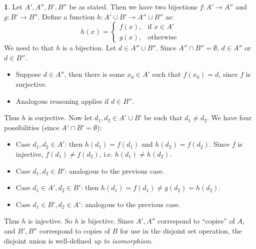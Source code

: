 \documentclass{article}
\theoremstyle{definition}
\theoremstyle{definition}
\theoremstyle{definition}
\newtheorem{solution-internal}{}[subsection]
\newenvironment{solution}{
  \medskip
  \begin{solution-internal}
}{
  \end{solution-internal}
}
\begin{document}
\begin{solution}
Let $A', A'', B', B''$ be as stated. Then we have two bijections $f\colon A' \to A''$ and $g\colon B' \to B''$. Define a function $h\colon A' \cup B' \to A'' \cup B''$ as:
\[ h(x) = 
\left\{
  \begin{array}{ll}
    f(x), & \text{if $x \in A'$} \\
    g(x), & \text{otherwise}
  \end{array}\right.
\]
We need to that $h$ is a bijection. Let $d \in A'' \cup B''$. Since $A'' \cap B'' = \emptyset$, $d \in A''$ or $d \in B''$.
\begin{itemize}
\item Suppose $d \in A''$, then there is some $x_0 \in A'$ such that $f(x_0) = d$, since $f$ is surjective.
\item Analogous reasoning applies if $d \in B''$.
\end{itemize}
Thus $h$ is surjective. Now let $d_1, d_2 \in A' \cup B'$ be such that $d_1 \neq d_2$. We have four possibilities (since $A' \cap B' = \emptyset$):
\begin{itemize}
\item Case $d_1, d_2 \in A'$: then $h(d_1) = f(d_1)$ and $h(d_2) = f(d_2)$. Since $f$ is injective, $f(d_1) \neq f(d_2)$, i.e. $h(d_1) \neq h(d_2)$.
\item Case $d_1, d_2 \in B'$: analogous to the previous case.
\item Case $d_1 \in A', d_2 \in B'$: then $h(d_1) = f(d_1) \neq g(d_2) = h(d_2)$.
\item Case $d_1 \in B', d_2 \in A'$: analogous to the previous case.
\end{itemize}
Thus $h$ is injective. So $h$ is bijective.
Since $A', A''$ correspond to ``copies'' of $A$, and $B', B''$ correspond to copies of $B$ for use in the disjoint set operation, the disjoint union is well-defined \textit{up to isomorphism}.

\end{solution}
\end{document}
